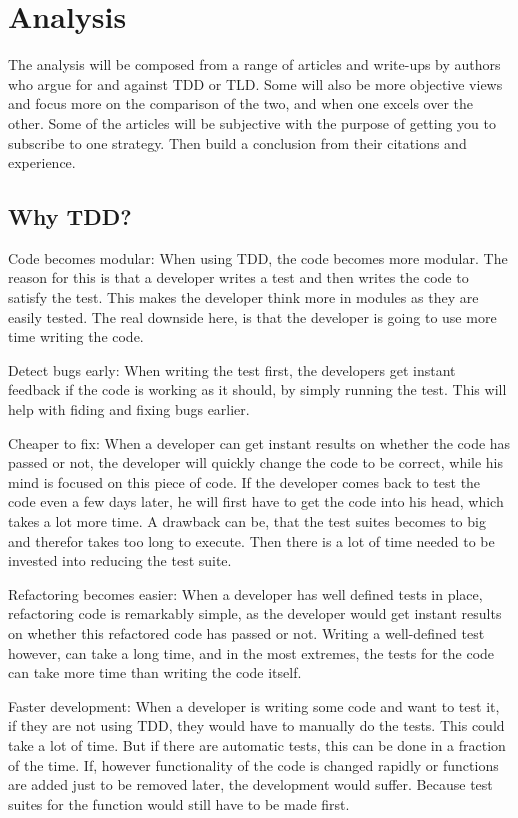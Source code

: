 \section{Analysis}
\label{section:analysis}
The analysis will be composed from a range of articles and write-ups by authors who argue for and against TDD or TLD. 
Some will also be more objective views and focus more on the comparison of the two, and when one excels over the other. 
Some of the articles will be subjective with the purpose of getting you to subscribe to one strategy. 
Then build a conclusion from their citations and experience.   

\subsection{Why TDD?}
Code becomes modular:
When using TDD, the code becomes more modular. The reason for this is that a developer writes a test and then writes the code to satisfy the test.  This makes the developer think more in modules as they are easily tested. The real downside here, is that the developer is going to use more time writing the code.

Detect bugs early:
When writing the test first, the developers get instant feedback if the code is working as it should, by simply running the test. This will help with fiding and fixing bugs earlier.  

Cheaper to fix:
When a developer can get instant results on whether the code has passed or not, the developer will quickly change the code to be correct, while his mind is focused on this piece of code. If the developer comes back to test the code even a few days later, he will first have to get the code into his head, which takes a lot more time.
A drawback can be, that the test suites becomes to big and therefor takes too long to execute. Then there is a lot of time needed to be invested into reducing the test suite.

Refactoring becomes easier:
When a developer has well defined tests in place, refactoring code is remarkably simple, as the developer would get instant results on whether this refactored code has passed or not. Writing a well-defined test however, can take a long time, and in the most extremes, the tests for the code can take more time than writing the code itself.

Faster development:
When a developer is writing some code and want to test it, if they are not using TDD, they would have to manually do the tests. This could take a lot of time. But if there are automatic tests, this can be done in a fraction of the time. If, however functionality of the code is changed rapidly or functions are added just to be removed later, the development would suffer. Because test suites for the function would still have to be made first.

